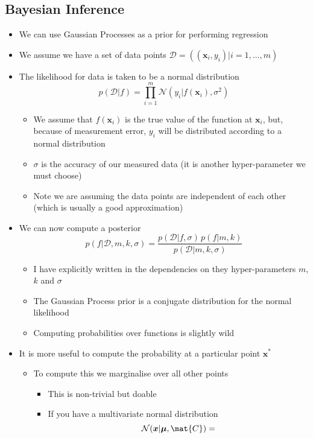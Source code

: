 \documentclass[11pt]{article}
\begin{document}
\subsection{Bayesian Inference}
\label{sec:orgc8008c7}
\begin{itemize}
\item We can use Gaussian Processes as a prior for performing regression
\item We assume we have a set of data points \(\mathcal{D} = \left( (\bm{x}_i, y_i)
      \big\vert i=1,\ldots, m \right)\)
\item The likelihood for data  is taken to be a normal distribution
$$ p(\mathcal{D}| f) = \prod_{i=1}^m 
      \mathcal{N}\left(y_i \big\vert f(\bm{x}_i), \sigma^2\right) $$
\begin{itemize}
\item We assume that \(f(\bm{x}_i)\) is the true value of the function
at \(\bm{x}_i\), but, because of measurement error, \(y_i\) will be
distributed according to a normal distribution
\item \(\sigma\) is the accuracy of our measured data (it is another
hyper-parameter we must choose)
\item Note we are assuming the data points are independent of each other
(which is usually a good approximation)
\end{itemize}
\item We can now compute a posterior
$$ p(f|\mathcal{D}, m, k, \sigma) = \frac{p(\mathcal{D}| f, \sigma)  \,
     p(f|m,k)}{p(\mathcal{D}|m,k,\sigma)}  $$ 
\begin{itemize}
\item I have explicitly written in the dependencies on they
hyper-parameters \(m\), \(k\) and \(\sigma\)
\item The Gaussian Process prior is a conjugate distribution for the
normal likelihood
\item Computing probabilities over functions is slightly wild
\end{itemize}
\item It is more useful to compute the probability at a particular
point \(\bm{x}^*\)
\begin{itemize}
\item To compute this we marginalise over all other points
\begin{itemize}
\item This is non-trivial but doable
\item If you have a multivariate normal distribution
$$ \mathcal{N}(\bm{x}| \bm{\mu},\mat{C}) =
$$
\end{itemize}
\end{itemize}
\end{itemize}
\end{document}
